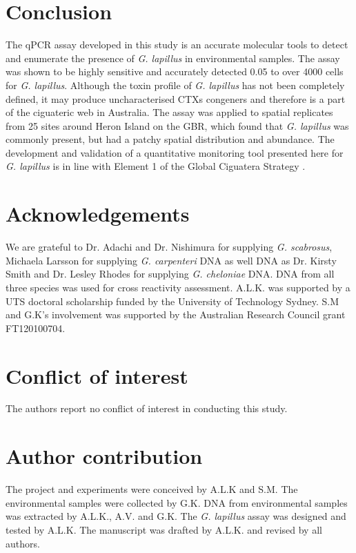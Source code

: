\documentclass[12pt]{article}
\begin{document}
\section*{Conclusion}
The qPCR assay developed in this study is an accurate molecular tools to detect and enumerate the presence of \emph{G. lapillus} %
in environmental samples. 
The assay was shown to be highly sensitive and accurately detected 0.05 to over 4000 cells for \emph{G. lapillus}. %
Although the toxin profile of \emph{G. lapillus} has not been completely defined, it may produce uncharacterised CTXs congeners \cite{kretzschmar2017characterization,larsson2018toxicology} and therefore is a part of the ciguateric web in Australia.
The assay was applied to spatial replicates from 25 sites around Heron Island on the GBR, which found that \textit{G. lapillus} was commonly present, but had a patchy spatial distribution and abundance. 
The development and validation of a quantitative monitoring tool presented here for \textit{G. lapillus} is in line with Element 1 of the Global Ciguatera Strategy \cite{globalcig}.

 \section*{Acknowledgements}
We are grateful to Dr. Adachi and Dr. Nishimura for supplying \emph{G. scabrosus}, Michaela Larsson for supplying \emph{G. carpenteri} DNA as well DNA as Dr. Kirsty Smith and Dr. Lesley Rhodes for supplying \emph{G. cheloniae} DNA. 
DNA from all three species was used for cross reactivity assessment. 
A.L.K. was supported by a UTS doctoral scholarship funded by the University of Technology Sydney. 
S.M and G.K’s involvement was supported by the Australian Research Council grant FT120100704. 

\section*{Conflict of interest}
The authors report no conflict of interest in conducting this study.

\section*{Author contribution}
The project and experiments were conceived by A.L.K and S.M. 
The environmental samples were collected by G.K. 
DNA from environmental samples was extracted by A.L.K., A.V. and G.K. %
The \emph{G. lapillus} assay was designed and tested by A.L.K.
The manuscript was drafted by A.L.K. and revised by all authors.

\FloatBarrier
\newpage
%
%


\end{document}

